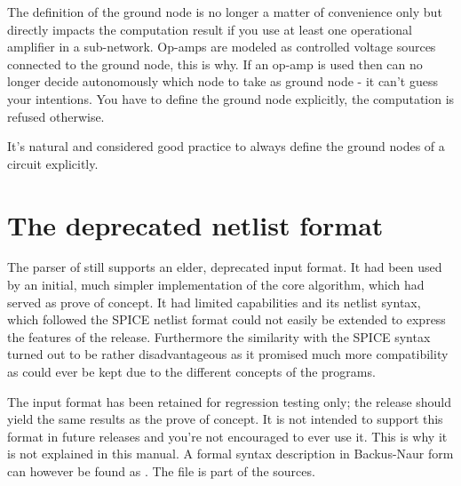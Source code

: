 The definition of the ground node is no longer a matter of convenience
only but directly impacts the computation result if you use at least one
operational amplifier in a sub-network. Op-amps are modeled as controlled
voltage sources connected to the ground node, this is why. If an op-amp is
used then \linnet{} can no longer decide autonomously which node to take
as ground node - it can't guess your intentions. You have to define the
ground node explicitly, the computation is refused otherwise.

It's natural and considered good practice to always define the ground
nodes of a circuit explicitly.


\section{The deprecated netlist format }

The parser of \linnet{} still supports an elder, deprecated input format.
It had been used by an initial, much simpler implementation of the core
algorithm, which had served as prove of concept. It had limited
capabilities and its netlist syntax, which followed the SPICE netlist
format could not easily be extended to express the features of the
\linnet{} release. Furthermore the similarity with the SPICE syntax turned
out to be rather disadvantageous as it promised much more compatibility
as could ever be kept due to the different concepts of the programs.

The  input format has been retained for regression testing
only; the \linnet{} release should yield the same results as the prove of
concept. It is not intended to support this format in future releases and
you're not encouraged to ever use it. This is why it is not explained in
this manual. A formal syntax description in Backus-Naur form can however
be found as . The file is part of the \linnet{}
sources.
